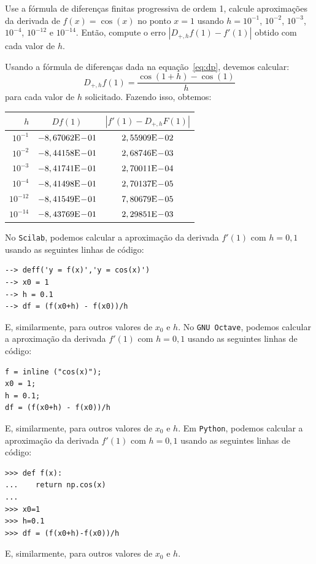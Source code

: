 \begin{ex}\label{ex:dp}
Use a fórmula de diferenças finitas progressiva de ordem 1, calcule aproximações da derivada de $f(x)=\cos(x)$ no ponto $x=1$ usando $h=10^{-1}$, $10^{-2}$, $10^{-3}$, $10^{-4}$, $10^{-12}$ e $10^{-14}$. Então, compute o erro $|D_{+,h}f(1)-f'(1)|$ obtido com cada valor de $h$.
\end{ex}
\begin{sol}
Usando a fórmula de diferenças dada na equação~\eqref{eq:dp}, devemos calcular:
\begin{equation*}
  D_{+,h}f(1) = \frac{\cos(1 + h) - \cos(1)}{h}
\end{equation*}
para cada valor de $h$ solicitado. Fazendo isso, obtemos:
\begin{center}
  \begin{tabular}{r|c|c}
    $h$ & $Df(1)$ & $|f'(1) - D_{+,h}F(1)|$ \\ \hline
    $10^{-1}$ & $-8,67062\mathrm{E}\!-\!01$ & $2,55909\mathrm{E}\!-\!02$\\
    $10^{-2}$ & $-8,44158\mathrm{E}\!-\!01$ & $2,68746\mathrm{E}\!-\!03$\\
    $10^{-3}$ & $-8,41741\mathrm{E}\!-\!01$ & $2,70011\mathrm{E}\!-\!04$\\
    $10^{-4}$ & $-8,41498\mathrm{E}\!-\!01$ & $2,70137\mathrm{E}\!-\!05$ \\
    $10^{-12}$ & $-8,41549\mathrm{E}\!-\!01$ & $7,80679\mathrm{E}\!-\!05$\\
    $10^{-14}$ & $-8,43769\mathrm{E}\!-\!01$ & $2,29851\mathrm{E}\!-\!03$ \\\hline
  \end{tabular}
\end{center}

\ifisscilab
No \verb+Scilab+, podemos calcular a aproximação da derivada $f'(1)$ com $h=0,1$ usando as seguintes linhas de código:
\begin{verbatim}
--> deff('y = f(x)','y = cos(x)')
--> x0 = 1
--> h = 0.1
--> df = (f(x0+h) - f(x0))/h
\end{verbatim}
E, similarmente, para outros valores de $x_0$ e $h$.
\fi
\ifisoctave
No \verb+GNU Octave+, podemos calcular a aproximação da derivada $f'(1)$ com $h=0,1$ usando as seguintes linhas de código:
\begin{verbatim}
f = inline ("cos(x)");
x0 = 1;
h = 0.1;
df = (f(x0+h) - f(x0))/h
\end{verbatim}
E, similarmente, para outros valores de $x_0$ e $h$.
\fi
\ifispython
Em \verb+Python+, podemos calcular a aproximação da derivada $f'(1)$ com $h=0,1$ usando as seguintes linhas de código:
\begin{verbatim}
>>> def f(x):
...    return np.cos(x)
...
>>> x0=1
>>> h=0.1
>>> df = (f(x0+h)-f(x0))/h
\end{verbatim}
E, similarmente, para outros valores de $x_0$ e $h$.
\fi
\end{sol}

